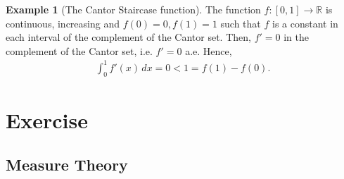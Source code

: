 \documentclass[11pt]{book}
\theoremstyle{definition}
\newtheorem{example}{Example}[chapter]
\numberwithin{equation}{chapter}
\begin{document}
\medskip

\begin{example}[The Cantor Staircase function]
The function $f: [0,1] \to \mathbb{R}$ is continuous, increasing and $f(0) = 0, f(1) = 1$ such that $f$ is a constant in each interval of the complement of the Cantor set. Then, $f' = 0$ in the complement of the Cantor set, i.e. $f' = 0$ a.e. Hence,
\begin{align*}
    \int^1_0 f'(x) \,dx = 0 < 1 = f(1) - f(0).
\end{align*}
\end{example}

\medskip











\chapter{Exercise}

\section{Measure Theory}
\end{document}
